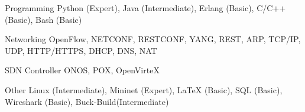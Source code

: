 

\begin{cvskills}

  \cvskill
    {Programming} %
    {Python (Expert), Java (Intermediate), Erlang (Basic), C/C++ (Basic),
      Bash (Basic)} %

  \cvskill
    {Networking} %
    {OpenFlow, NETCONF, RESTCONF, YANG, REST, ARP, TCP/IP, UDP, HTTP/HTTPS,
      DHCP, DNS, NAT} %

  \cvskill
    {SDN Controller} %
    {ONOS, POX, OpenVirteX} %

  \cvskill
    {Other} %
    {Linux (Intermediate), Mininet (Expert), LaTeX (Basic), SQL (Basic), Wireshark (Basic),
     Buck-Build(Intermediate)} %
\end{cvskills}